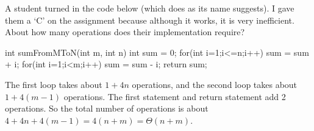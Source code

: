 \begin{exa}\label{exa:summn}
A student turned in the code below (which does as its name suggests).  
I gave them a `C' on the assignment because although it works,
it is very inefficient.  About how many operations does their
implementation require?
\begin{code}
	int sumFromMToN(int m, int n) {
	    int sum = 0;
	    for(int i=1;i<=n;i++) {
	        sum = sum + i;
	    }
	    for(int i=1;i<m;i++) {
	        sum = sum - i;
	    }
	    return sum;
	}
\end{code}
\begin{sol}
The first loop takes about $1+4n$ operations, and the second loop takes about
$1+4(m-1)$ operations.  The first statement and return statement add 2 operations.
So the total number of operations is about $4+4n+4(m-1)=4(n+m)=\Theta(n+m)$.
\end{sol}
\end{exa}


